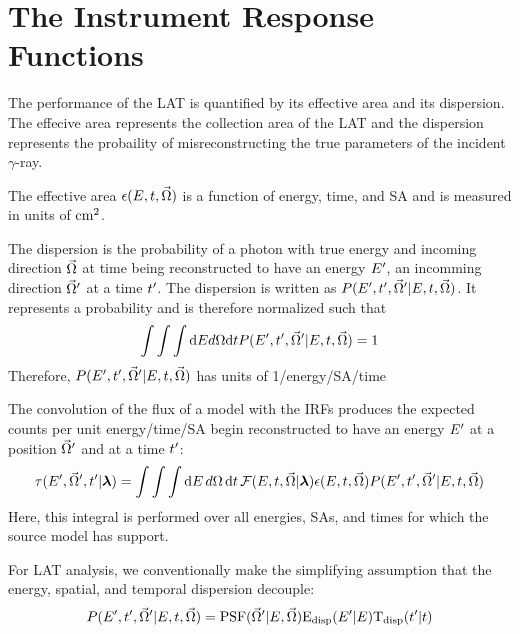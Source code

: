 \section{The  Instrument Response Functions}


The performance of the LAT is quantified by its effective area
and its dispersion. The effecive area represents the collection area of the
\ac{LAT} and the dispersion represents the probaility of misreconstructing
the true parameters of the incident $\gamma$-ray.

The
effective area $\epsilon(E,t,\vec\Omega)$
is a function of energy, time, and \ac{SA} and is measured in units of 
$\text{cm}^2$. 

The dispersion is the probability of a photon with true energy
\energy and incoming direction $\vec\Omega$ at time \time being
reconstructed to have an energy $E'$, an incomming direction
$\vec\Omega'$ at a time $t'$.  The dispersion is written as
$P(E',t',\vec\Omega'|E,t,\vec\Omega)$.
It represents a probability and is therefore normalized such that
\begin{equation}
  \int \int \int \text{d}E d\Omega \text{d}t 
  P(E',t',\vec\Omega'|E,t,\vec\Omega) = 1
\end{equation}
Therefore,
$P(E',t',\vec\Omega'|E,t,\vec\Omega)$
has units of 1/energy/\acl{SA}/time

The convolution of the flux of a model with the \acp{IRF}
produces the expected counts per unit energy/time/\acl{SA}
begin reconstructed to have 
an energy $E'$ 
at a position $\vec\Omega'$ and at a time $t'$:
\begin{equation}
  \eqnlabel{eventrate}
  \eventrate(\energy',\solidangle',\time'|\modelparams)
  = \int \int \int \denergy \, \dsolidangle \, \dtime \,
  \fluxdensity(\energy,\time,\vec\Omega|\modelparams) 
  \effectivearea(\energy,\time,\solidangle) \dispersion(\energy',\time',\solidangle'|\energy,\time,\solidangle)
\end{equation}
Here, this integral is performed over all energies, \acp{SA}, and times
for which the source model has support.

For LAT analysis, we conventionally make the simplifying assumption that
the energy, spatial, and temporal dispersion decouple:
\begin{equation}
  P(E',t',\vec\Omega'|E,t,\vec\Omega) = 
  \text{PSF}(\vec\Omega'|E,\vec\Omega) \text{E}_\text{disp}(E'|E) \text{T}_\text{disp}(t'|t)
\end{equation}

